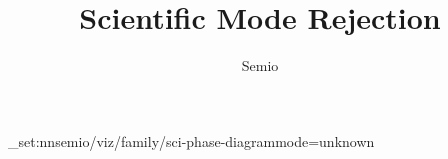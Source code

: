 \documentclass[type=paper,language=de,theme=dark]{semio}
\title{Scientific Mode Rejection}
\author{Semio}
\date{}
\begin{document}
\SemioVizProbePage
\ExplSyntaxOn\keys_set:nn{semio/viz/family/sci-phase-diagram}{mode=unknown}\ExplSyntaxOff
{}
\SemioVizProbeEnd
\end{document}

